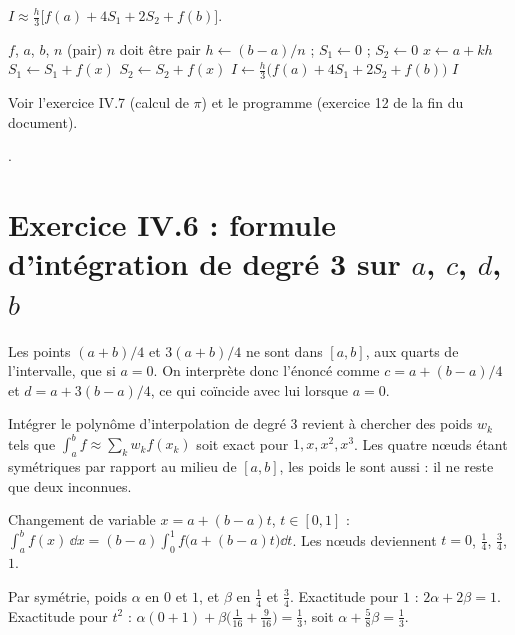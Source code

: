  $I \approx \tfrac h3\bigl[f(a) + 4S_1 + 2S_2 + f(b)\bigr]$.

\begin{algo}
  \Require $f$, $a$, $b$, $n$ (pair)
   \Print \og $n$ doit être pair \fg{} \Stop \EndIf
  \State $h \leftarrow (b-a)/n$ ; $S_1 \leftarrow 0$ ; $S_2 \leftarrow 0$
    \State $x \leftarrow a + kh$
     \State $S_1 \leftarrow S_1 + f(x)$
    \Else \State $S_2 \leftarrow S_2 + f(x)$
    \EndIf
  \EndFor
  \State $I \leftarrow \frac{h}{3}\bigl(f(a) + 4S_1 + 2S_2 + f(b)\bigr)$
  \Print $I$
\end{algo}

\Verif Voir l'exercice IV.7 (calcul de $\pi$) et le programme
 (exercice 12 de la fin du document).

\Refs {}.

\section{\texorpdfstring{Exercice IV.6 : formule d'intégration de degré 3 sur $a$, $c$, $d$, $b$}{Exercice IV.6 : formule d'intégration de degré 3 sur a, c, d, b}}


\Attention Les points $(a+b)/4$ et $3(a+b)/4$ ne sont dans $[a,b]$, aux
quarts de l'intervalle, que si $a = 0$. On interprète donc l'énoncé comme
$c = a + (b-a)/4$ et $d = a + 3(b-a)/4$, ce qui coïncide avec lui lorsque
$a = 0$.

\Pourquoi Intégrer le polynôme d'interpolation de degré 3 revient à chercher
des poids $w_k$ tels que $\int_a^b f \approx \sum_k w_kf(x_k)$ soit exact pour
$1, x, x^2, x^3$. Les quatre nœuds étant symétriques par rapport au milieu de
$[a,b]$, les poids le sont aussi : il ne reste que deux inconnues.

\Etapes
{} Changement de variable $x = a + (b-a)t$, $t \in [0,1]$ :
$\int_a^b f(x)\,\dd x = (b-a)\int_0^1 f\bigl(a + (b-a)t\bigr)\dd t$. Les nœuds
deviennent $t = 0$, $\tfrac14$, $\tfrac34$, $1$.

 Par symétrie, poids $\alpha$ en $0$ et $1$, et $\beta$ en $\tfrac14$ et
$\tfrac34$. Exactitude pour $1$ : $2\alpha + 2\beta = 1$. Exactitude pour
$t^2$ : $\alpha(0 + 1) + \beta\bigl(\tfrac1{16} + \tfrac9{16}\bigr) = \tfrac13$,
soit $\alpha + \tfrac58\beta = \tfrac13$.

